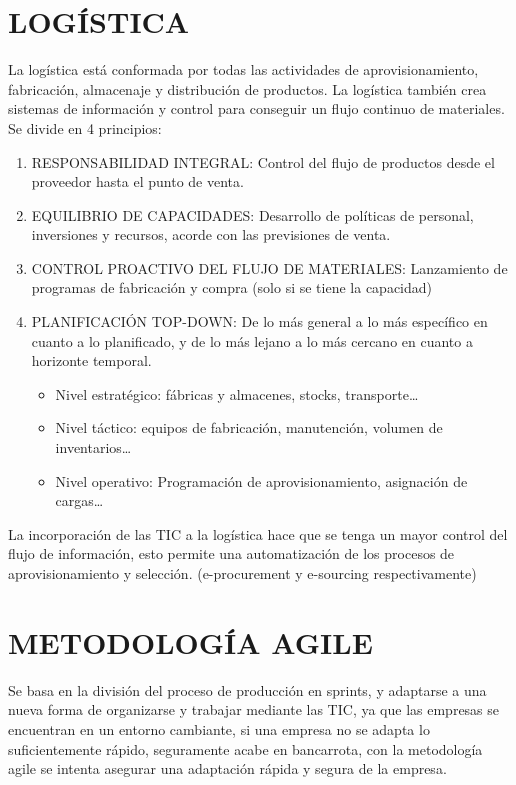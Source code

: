 \documentclass[12pt, twoside, openright]{report} %
\begin{document}
\section{LOGÍSTICA}
La logística está conformada por todas las actividades de aprovisionamiento, fabricación, almacenaje y distribución de productos. La logística también crea sistemas de información y control para conseguir un flujo continuo de materiales. Se divide en 4 principios:
\begin{enumerate}
	\item RESPONSABILIDAD INTEGRAL: Control del flujo de productos desde el proveedor hasta el punto de venta.
	\item EQUILIBRIO DE CAPACIDADES: Desarrollo de políticas de personal, inversiones y recursos, acorde con las previsiones de venta.
	\item CONTROL PROACTIVO DEL FLUJO DE MATERIALES: Lanzamiento de programas de fabricación y compra (solo si se tiene la capacidad)
	\item PLANIFICACIÓN TOP-DOWN: De lo más general a lo más específico en cuanto a lo planificado, y de lo más lejano a lo más cercano en cuanto a horizonte temporal.
	      \begin{itemize}
		      \item Nivel estratégico: fábricas y almacenes, stocks, transporte…
		      \item Nivel táctico: equipos de fabricación, manutención, volumen de inventarios…
		      \item Nivel operativo: Programación de aprovisionamiento, asignación de cargas…
	      \end{itemize}
\end{enumerate}

La incorporación de las TIC a la logística hace que se tenga un mayor control del flujo de información, esto permite una automatización de los procesos de aprovisionamiento y selección. (e-procurement y e-sourcing respectivamente)

\section{METODOLOGÍA AGILE}
Se basa en la división del proceso de producción en sprints, y adaptarse a una nueva forma de organizarse y trabajar mediante las TIC, ya que las empresas se encuentran en un entorno cambiante, si una empresa no se adapta lo suficientemente rápido, seguramente acabe en bancarrota, con la metodología agile se intenta asegurar una adaptación rápida y segura de la empresa.
\end{document}
